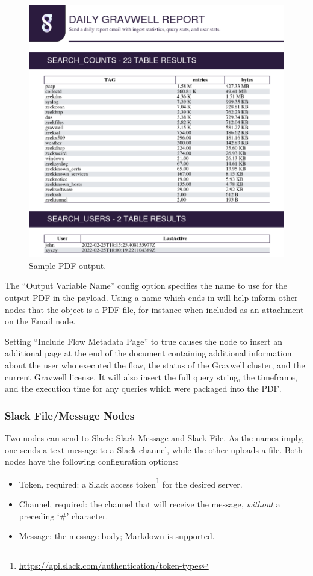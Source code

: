 \begin{figure}
	\includegraphics[width=0.85\linewidth]{images/pdf-result.png}
	\caption{Sample PDF output.}
	\label{fig:pdf-result}
\end{figure}

The ``Output Variable Name'' config option specifies the name to use for the output PDF in the payload. Using a name which ends in  will help inform other nodes that the object is a PDF file, for instance when included as an attachment on the Email node.

Setting ``Include Flow Metadata Page'' to true causes the node to insert an additional page at the end of the document containing additional information about the user who executed the flow, the status of the Gravwell cluster, and the current Gravwell license. It will also insert the full query string, the timeframe, and the execution time for any queries which were packaged into the PDF.
\clearpage

\subsubsection{Slack File/Message Nodes}
Two nodes can send to Slack: Slack Message and Slack File. As the names imply, one sends a text message to a Slack channel, while the other uploads a file. Both nodes have the following configuration options:

\begin{itemize}
\item Token, required: a Slack access token\footnote{\href{https://api.slack.com/authentication/token-types}{https://api.slack.com/authentication/token-types}} for the desired server.
\item Channel, required: the channel that will receive the message, \emph{without} a preceding `\#' character.
\item Message: the message body; Markdown is supported.
\end{itemize}

